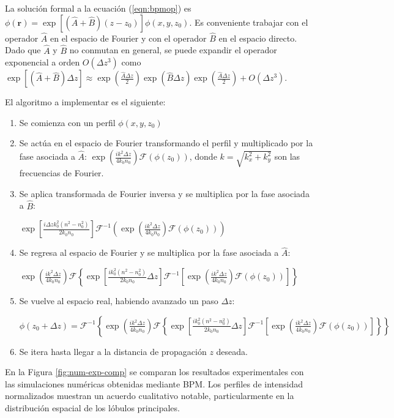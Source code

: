 La solución formal a la ecuación (\ref{eqn:bpmop}) es $\phi(\textbf{r}) = \exp\left[\left(\hat{A} + \hat{B}\right)(z-z_0)\right]\phi(x, y, z_0)$. Es conveniente trabajar con el operador $\hat{A}$ en el espacio de Fourier y con el operador $\hat{B}$ en el espacio directo. Dado que $\hat{A}$ y $\hat{B}$ no conmutan en general, se puede expandir el operador exponencial a orden $O(\Delta z ^3)$ como $\exp\left[\left(\hat{A} + \hat{B}\right)\Delta z \right] \approx \exp\left(\frac{\hat{A}\Delta z}{2} \right)\exp\left(\hat{B}\Delta z \right)\exp\left(\frac{\hat{A}\Delta z}{2} \right) + O(\Delta z ^3)$.

El algoritmo a implementar es el siguiente:
\begin{enumerate}
	\item   Se comienza con un perfil $\phi(x, y, z_0)$
\item   Se actúa en el espacio de Fourier transformando el perfil y multiplicado por la fase asociada a $\hat{A}$: $\exp\left(\frac{ik^2\Delta z}{4k_0 n_0}\right)\mathcal{F}(\phi(z_0))$, donde $k=\sqrt{k_x^2 + k_y^2}$ son las frecuencias de Fourier.
\item   Se aplica transformada de Fourier inversa y se multiplica por la fase asociada a $\hat{B}$: 

$\exp\left[\frac{i\Delta z k_0^2(n^2-n_0^2)}{2 k_0n_0}\right]\mathcal{F}^{-1}\left(\exp\left(\frac{ik^2 \Delta z}{4k_0 n_0}\right)\mathcal{F}(\phi(z_0))\right)$
\item  Se regresa al espacio de Fourier y se multiplica por la fase asociada a $\hat{A}$:
 
$\exp\left(\frac{ik^2\Delta z}{4k_0 n_0}\right)\mathcal{F}\left\{\exp\left[\frac{ik_0^2(n^2-n_0^2)}{2 k_0n_0}\Delta z \right]\mathcal{F}^{-1}\left[\exp\left(\frac{ik^2\Delta z}{4k_0 n_0}\right)\mathcal{F}(\phi(z_0))\right]\right\}$
\item Se vuelve al espacio real, habiendo avanzado un paso $\Delta z$:

$\phi(z_0+\Delta z)=\mathcal{F}^{-1}\left\{\exp\left(\frac{ik^2\Delta z}{4k_0 n_0}\right)\mathcal{F}\left\{\exp\left[\frac{i k_0^2(n^2-n_0^2)}{2 k_0n_0}\Delta z\right]\mathcal{F}^{-1}\left[\exp\left(\frac{ik^2\Delta z}{4k_0 n_0}\right)\mathcal{F}(\phi(z_0))\right]\right\} \right\}$

\item Se itera hasta llegar a la distancia de propagación $z$ deseada.
\end{enumerate}
En la Figura \ref{fig:num-exp-comp} se comparan los resultados experimentales con las simulaciones numéricas obtenidas mediante BPM. Los perfiles de intensidad normalizados muestran un acuerdo cualitativo notable, particularmente en la distribución espacial de los lóbulos principales.

